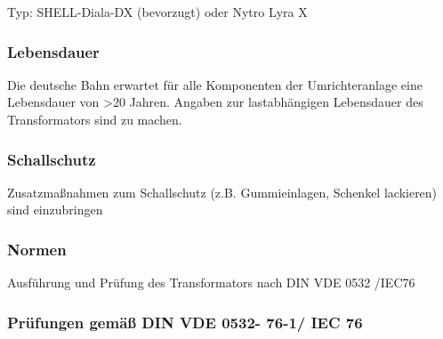 Typ:	 SHELL-Diala-DX (bevorzugt) oder Nytro Lyra X 

\subsubsection*{Lebensdauer}
Die deutsche Bahn erwartet für alle Komponenten der Umrichteranlage eine Lebensdauer von >20 Jahren. Angaben zur lastabhängigen Lebensdauer des Transformators sind zu machen. 

\subsubsection*{Schallschutz}
Zusatzmaßnahmen zum Schallschutz (z.B. Gummieinlagen, Schenkel lackieren) sind einzubringen

\subsubsection*{Normen}
Ausführung und Prüfung des Transformators nach DIN VDE 0532 /IEC76 
\subsubsection*{Prüfungen gemäß DIN VDE 0532- 76-1/ IEC 76}
